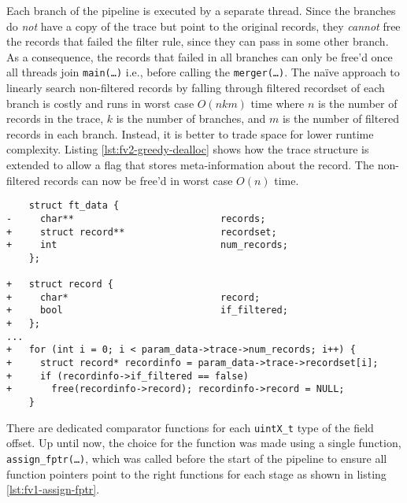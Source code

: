 Each branch of the pipeline is executed by a separate thread. Since the
branches do \emph{not} have a copy of the trace but point to the original
records, they \emph{cannot} free the records that failed the filter rule,
since they can pass in some other branch. As a consequence, the records that
failed in all branches can only be free'd once all threads join
\texttt{main(\ldots)} i.e., before calling the \texttt{merger(\ldots)}. The
na\"ive approach to 
linearly search non-filtered records by falling through filtered recordset of
each branch is costly and runs in worst case $O(nkm)$ time where $n$ is the
number of records in the trace, $k$ is the number of branches, and $m$ is the
number of filtered records in each branch. Instead, it is better to trade
space for lower runtime complexity. Listing \ref{lst:fv2-greedy-dealloc} shows
how the trace structure is extended to allow a flag that stores
meta-information about the record. The non-filtered records can now be free'd
in worst case $O(n)$ time.

\begin{lstlisting}
    struct ft_data {
-     char**                          records;
+     struct record**                 recordset;
+     int                             num_records;
    };

+   struct record {
+     char*                           record;
+     bool                            if_filtered;
+   };
...
+   for (int i = 0; i < param_data->trace->num_records; i++) {
+     struct record* recordinfo = param_data->trace->recordset[i];
+     if (recordinfo->if_filtered == false)
+       free(recordinfo->record); recordinfo->record = NULL;
    }
\end{lstlisting}




There are dedicated comparator functions for each \texttt{uintX\_t} type of
the field offset. Up until now, the choice for the function was made using a
single function, \texttt{assign\_fptr(\ldots)}, which was called before the
start of the pipeline to ensure all function pointers point to the right
functions for each stage as shown in listing \ref{lst:fv1-assign-fptr}.



